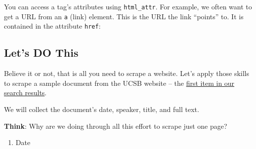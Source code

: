 \documentclass[]{book}
\newenvironment{Shaded}{\begin{snugshade}}{\end{snugshade}}
\newcommand{\KeywordTok}[1]{\textcolor[rgb]{0.13,0.29,0.53}{\textbf{#1}}}
\newcommand{\StringTok}[1]{\textcolor[rgb]{0.31,0.60,0.02}{#1}}
\newcommand{\CommentTok}[1]{\textcolor[rgb]{0.56,0.35,0.01}{\textit{#1}}}
\newcommand{\OperatorTok}[1]{\textcolor[rgb]{0.81,0.36,0.00}{\textbf{#1}}}
\newcommand{\NormalTok}[1]{#1}
\providecommand{\tightlist}{%
  \setlength{\itemsep}{0pt}\setlength{\parskip}{0pt}}
\begin{document}
You can access a tag's attributes using \texttt{html\_attr}. For
example, we often want to get a URL from an \texttt{a} (link) element.
This is the URL the link ``points'' to. It is contained in the attribute
\texttt{href}:

\begin{Shaded}
\end{Shaded}

\subsection{Let's DO This}\label{lets-do-this}

Believe it or not, that is all you need to scrape a website. Let's apply
those skills to scrape a sample document from the UCSB website -- the
\href{\%22http://www.presidency.ucsb.edu/documents/letter-t-keith-glennan-administrator-national-aeronautics-and-space-administration\%22}{first
item in our search results}.

We will collect the document's date, speaker, title, and full text.

\textbf{Think}: Why are we doing through all this effort to scrape just
one page?

\begin{enumerate}
\def\labelenumi{\arabic{enumi}.}
\tightlist
\item
  Date
\end{enumerate}

\begin{Shaded}
\end{Shaded}
\end{document}
